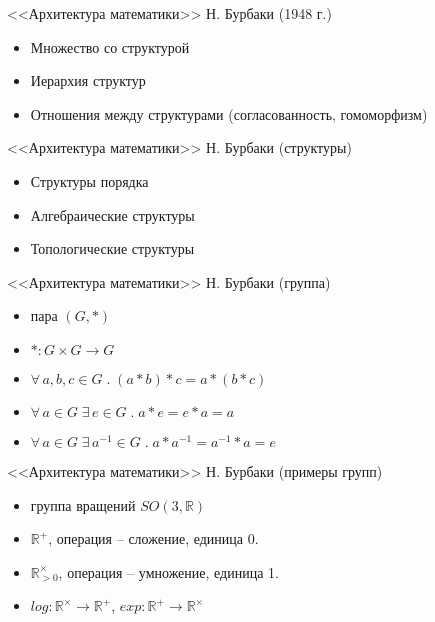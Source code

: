 \documentclass{beamer}
\begin{document}
\begin{frame}{<<Архитектура математики>> Н. Бурбаки (1948 г.)}
    \begin{itemize}
        \item Множество со структурой
        \item Иерархия структур
        \item Отношения между структурами (согласованность, гомоморфизм)
    \end{itemize}
\end{frame}

\begin{frame}{<<Архитектура математики>> Н. Бурбаки (структуры)}
    \begin{itemize}
        \item Структуры порядка
        \item Алгебраические структуры
        \item Топологические структуры
    \end{itemize}
\end{frame}

\begin{frame}{<<Архитектура математики>> Н. Бурбаки (группа)}
    \begin{itemize}
        \item пара $(G, \ast)$
        \item $\ast : G \times G \to G$ 
        \item $\forall \, a, b, c \in G \; . \; (a \ast b) \ast c = a \ast (b \ast c)$
        \item $\forall \, a \in G \; \exists \, e \in G \; . \; a \ast e = e \ast a = a$
        \item $\forall \, a \in G \; \exists \, a^{-1} \in G \; . \; a \ast a^{-1} = a^{-1} \ast a = e$
    \end{itemize}
\end{frame}

\begin{frame}{<<Архитектура математики>> Н. Бурбаки (примеры групп)}
    \begin{itemize}
        \item группа вращений $SO(3, \mathbb{R})$ 
        \item $\mathbb{R}^+$, операция -- сложение, единица 0. 
        \item $\mathbb{R}_{\gt 0}^\times$, операция -- умножение, единица 1.
        \item $log : \mathbb{R}^\times \to \mathbb{R}^+$, $exp : \mathbb{R}^+ \to \mathbb{R}^\times $ 
    \end{itemize}
\end{frame}
\end{document}
